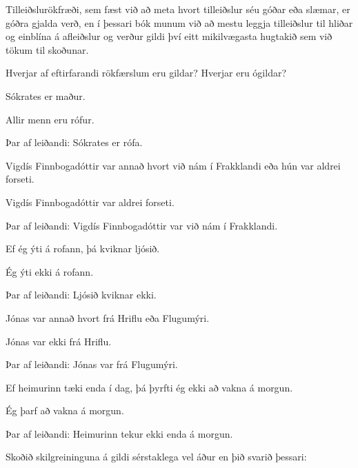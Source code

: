 Tilleiðslurökfræði, sem fæst við að meta hvort tilleiðslur séu góðar eða slæmar, er góðra gjalda verð, en í þessari bók munum við að mestu leggja tilleiðslur til hliðar og einblína á afleiðslur og verður gildi því eitt mikilvægasta hugtakið sem við tökum til skoðunar. 

\practiceproblems
\problempart

Hverjar af eftirfarandi rökfærslum eru gildar? Hverjar eru ógildar?

\begin{earg}
\item Sókrates er maður.
\item Allir menn eru rófur.
\item[Þar af leiðandi:] Sókrates er rófa.
\end{earg}

\begin{earg}
\item Vigdís Finnbogadóttir var annað hvort við nám í Frakklandi eða hún var aldrei forseti.
\item Vigdís Finnbogadóttir var aldrei forseti.
\item[Þar af leiðandi:] Vigdís Finnbogadóttir var við nám í Frakklandi. 
\end{earg}

\begin{earg}
\item Ef ég ýti á rofann, þá kviknar ljósið.
\item Ég ýti ekki á rofann.
\item[Þar af leiðandi:] Ljósið kviknar ekki.
\end{earg}

\begin{earg}
\item Jónas var annað hvort frá Hriflu eða Flugumýri.
\item Jónas var ekki frá Hriflu.
\item[Þar af leiðandi:] Jónas var frá Flugumýri.
\end{earg}

\begin{earg}
\item Ef heimurinn tæki enda í dag, þá þyrfti ég ekki að vakna á morgun.
\item Ég þarf að vakna á morgun.
\item[Þar af leiðandi:] Heimurinn tekur ekki enda á morgun.
\end{earg}

Skoðið skilgreininguna á gildi sérstaklega vel áður en þið svarið þessari:

